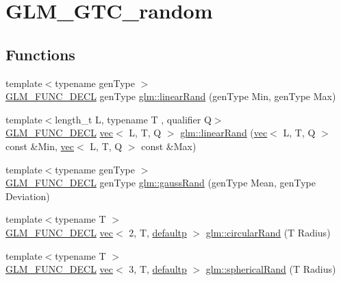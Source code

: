 \hypertarget{group__gtc__random}{}\section{G\+L\+M\+\_\+\+G\+T\+C\+\_\+random}
\label{group__gtc__random}
\subsection*{Functions}
\begin{DoxyCompactItemize}
\item 
{\footnotesize template$<$typename gen\+Type $>$ }\\\hyperlink{setup_8hpp_ab2d052de21a70539923e9bcbf6e83a51}{G\+L\+M\+\_\+\+F\+U\+N\+C\+\_\+\+D\+E\+CL} gen\+Type \hyperlink{group__gtc__random_ga04e241ab88374a477a2c2ceadd2fa03d}{glm\+::linear\+Rand} (gen\+Type Min, gen\+Type Max)
\item 
{\footnotesize template$<$length\+\_\+t L, typename T , qualifier Q$>$ }\\\hyperlink{setup_8hpp_ab2d052de21a70539923e9bcbf6e83a51}{G\+L\+M\+\_\+\+F\+U\+N\+C\+\_\+\+D\+E\+CL} \hyperlink{structglm_1_1vec}{vec}$<$ L, T, Q $>$ \hyperlink{group__gtc__random_ga94731130c298a9ff5e5025fdee6d97a0}{glm\+::linear\+Rand} (\hyperlink{structglm_1_1vec}{vec}$<$ L, T, Q $>$ const \&Min, \hyperlink{structglm_1_1vec}{vec}$<$ L, T, Q $>$ const \&Max)
\item 
{\footnotesize template$<$typename gen\+Type $>$ }\\\hyperlink{setup_8hpp_ab2d052de21a70539923e9bcbf6e83a51}{G\+L\+M\+\_\+\+F\+U\+N\+C\+\_\+\+D\+E\+CL} gen\+Type \hyperlink{group__gtc__random_ga5193a83e49e4fdc5652c084711083574}{glm\+::gauss\+Rand} (gen\+Type Mean, gen\+Type Deviation)
\item 
{\footnotesize template$<$typename T $>$ }\\\hyperlink{setup_8hpp_ab2d052de21a70539923e9bcbf6e83a51}{G\+L\+M\+\_\+\+F\+U\+N\+C\+\_\+\+D\+E\+CL} \hyperlink{structglm_1_1vec}{vec}$<$ 2, T, \hyperlink{namespaceglm_a36ed105b07c7746804d7fdc7cc90ff25a9d21ccd8b5a009ec7eb7677befc3bf51}{defaultp} $>$ \hyperlink{group__gtc__random_ga9dd05c36025088fae25b97c869e88517}{glm\+::circular\+Rand} (T Radius)
\item 
{\footnotesize template$<$typename T $>$ }\\\hyperlink{setup_8hpp_ab2d052de21a70539923e9bcbf6e83a51}{G\+L\+M\+\_\+\+F\+U\+N\+C\+\_\+\+D\+E\+CL} \hyperlink{structglm_1_1vec}{vec}$<$ 3, T, \hyperlink{namespaceglm_a36ed105b07c7746804d7fdc7cc90ff25a9d21ccd8b5a009ec7eb7677befc3bf51}{defaultp} $>$ \hyperlink{group__gtc__random_ga22f90fcaccdf001c516ca90f6428e138}{glm\+::spherical\+Rand} (T Radius)

\end{DoxyCompactItemize}

